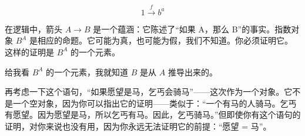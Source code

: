 \documentclass[DaoFP]{subfiles}
\begin{document}
 \[ 1 \xrightarrow f b^a\]

 在逻辑中，箭头 $A \to B$ 是一个蕴涵：它陈述了“如果 A，那么 B”的事实。指数对象 $B^A$ 是相应的命题。它可能为真，也可能为假，我们不知道。你必须证明它。这样的证明是 $B^A$ 的一个元素。

 给我看 $B^A$ 的一个元素，我就知道 $B$ 是从 $A$ 推导出来的。

 再考虑一下这个语句，“如果愿望是马，乞丐会骑马”——这次作为一个对象。它不是一个空对象，因为你可以指出它的证明——类似于：“一个有马的人骑马。乞丐有愿望。因为愿望是马，所以乞丐有马。因此，乞丐骑马。”但即使你有这个语句的证明，对你来说也没有用，因为你永远无法证明它的前提：“愿望 = 马”。
\end{document}
